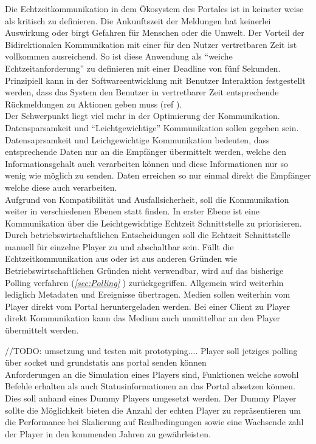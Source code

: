 Die Echtzeitkommunikation in dem Ökosystem des Portales ist in keinster weise als kritisch zu definieren. Die Ankunftszeit der Meldungen hat keinerlei Auswirkung oder birgt Gefahren für Menschen oder die Umwelt. Der Vorteil der Bidirektionalen Kommunikation mit einer für den Nutzer vertretbaren Zeit ist vollkommen ausreichend. So ist diese Anwendung als "`weiche Echtzeitanforderung"' zu definieren mit einer Deadline von fünf Sekunden.
\\Prinzipiell kann in der Softwareentwicklung mit Benutzer Interaktion festgestellt werden, dass das System den Benutzer in vertretbarer Zeit entsprechende Rückmeldungen zu Aktionen geben muss (ref \cite{usability heuristics}).
\\\newline Der Schwerpunkt liegt viel mehr in der Optimierung der Kommunikation. Datensparsamkeit und "`Leichtgewichtige"' Kommunikation sollen gegeben sein. Datensaprsamkeit und Leichgewichtige Kommunikation bedeuten, dass entsprechende Daten nur an die Empfänger übermittelt werden, welche den Informationsgehalt auch verarbeiten können und diese Informationen nur so wenig wie möglich zu senden. Daten erreichen so nur einmal direkt die Empfänger welche diese auch verarbeiten.
\\Aufgrund von Kompatibilität und Ausfallsicherheit, soll die Kommunikation weiter in verschiedenen Ebenen statt finden. In erster Ebene ist eine Kommunikation über die Leichtgewichtige Echtzeit Schnittstelle zu priorisieren. Durch betriebswirtschaftlichen Entscheidungen soll die Echtzeit Schnittstelle manuell für einzelne Player zu und abschaltbar sein. Fällt die Echtzeitkommunikation aus oder ist aus anderen Gründen wie \zB Betriebswirtschaftlichen Gründen nicht verwendbar, wird auf das bisherige Polling verfahren (\textit{\ref{sec:Polling} }) zurückgegriffen. Allgemein wird weiterhin lediglich Metadaten und Ereignisse übertragen. 
Medien sollen weiterhin vom Player direkt vom Portal heruntergeladen werden. Bei einer Client zu Player direkt Kommunikation kann das Medium auch unmittelbar an den Player übermittelt werden.
\\\newline







//TODO: umsetzung und testen mit prototyping.... Player soll jetziges polling über socket und grundstatis ans portal senden können
\\\newline
Anforderungen an die Simulation eines Players sind, Funktionen welche sowohl Befehle erhalten als auch Statusinformationen an das Portal absetzen können. Dies soll anhand eines Dummy Players umgesetzt werden. Der Dummy Player sollte die Möglichkeit bieten die Anzahl der echten Player zu repräsentieren um die Performance bei Skalierung auf Realbedingungen sowie eine Wachsende zahl der Player in den kommenden Jahren zu gewährleisten.







